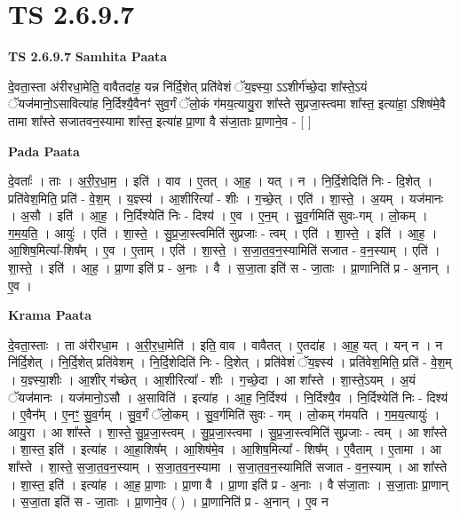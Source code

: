 \documentclass[17pt]{extarticle}
\begin{document}
\section*{ TS 2.6.9.7 }

\textbf{TS 2.6.9.7 } \newline
\textbf{Samhita Paata} \newline

दे॒वता॒स्ता अ॑रीरधा॒मेति॒ वावैतदा॑ह॒ यन्न नि॑र्दि॒शेत् प्रति॑वेशं ॅय॒ज्ञ्स्या॒ ऽऽशीर्ग॑च्छे॒दा शा᳚स्ते॒ऽयं ॅयज॑मानो॒ऽसावित्या॑ह नि॒र्दिश्यै॒वैनꣳ॑ सुव॒र्गं ॅलो॒कं ग॑मय॒त्यायु॒रा शा᳚स्ते सुप्रजा॒स्त्वमा शा᳚स्त॒ इत्या॑हा॒ ऽशिष॑मे॒वै तामा शा᳚स्ते सजातवन॒स्यामा शा᳚स्त॒ इत्या॑ह प्रा॒णा वै स॑जा॒ताः प्रा॒णाने॒व - [  ] \newline

\textbf{Pada Paata} \newline

दे॒वताः᳚ । ताः । अ॒री॒र॒धा॒म॒ । इति॑ । वाव । ए॒तत् । आ॒ह॒ । यत् । न । नि॒र्दि॒शेदिति॑ निः - दि॒शेत् । प्रति॑वेश॒मिति॒ प्रति॑ - वे॒श॒म् । य॒ज्ञ्स्य॑ । आ॒शीरित्या᳚ - शीः । ग॒च्छे॒त् । एति॑ । शा॒स्ते॒ । अ॒यम् । यज॑मानः । अ॒सौ । इति॑ । आ॒ह॒ । नि॒र्दिश्येति॑ निः - दिश्य॑ । ए॒व । ए॒न॒म् । सु॒व॒र्गमिति॑ सुवः-गम् । लो॒कम् । ग॒म॒य॒ति॒ । आयुः॑ । एति॑ । शा॒स्ते॒ । सु॒प्र॒जा॒स्त्वमिति॑ सुप्रजाः - त्वम् । एति॑ । शा॒स्ते॒ । इति॑ । आ॒ह॒ । आ॒शिष॒मित्या᳚-शिष᳚म् । ए॒व । ए॒ताम् । एति॑ । शा॒स्ते॒ । स॒जा॒त॒व॒न॒स्यामिति॑ सजात - व॒न॒स्याम् । एति॑ । शा॒स्ते॒ । इति॑ । आ॒ह॒ । प्रा॒णा इति॑ प्र - अ॒नाः । वै । स॒जा॒ता इति॑ स - जा॒ताः । प्रा॒णानिति॑ प्र - अ॒नान् । ए॒व ।  \newline


\textbf{Krama Paata} \newline

दे॒वता॒स्ताः । ता अ॑रीरधा॒म । अ॒री॒र॒धा॒मेति॑ । इति॒ वाव । वावैतत् । ए॒तदा॑ह । आ॒ह॒ यत् । यन् न । न नि॑र्दि॒शेत् । नि॒र्दि॒शेत् प्रति॑वेशम् । नि॒र्दि॒शेदिति॑ निः - दि॒शेत् । प्रति॑वेशं ॅय॒ज्ञ्स्य॑ । प्रति॑वेश॒मिति॒ प्रति॑ - वे॒श॒म् । य॒ज्ञ्स्या॒शीः । आ॒शीर् ग॑च्छेत् । आ॒शीरित्या᳚ - शीः । ग॒च्छे॒दा । आ शा᳚स्ते । शा॒स्ते॒ऽयम् । अ॒यं ॅयज॑मानः । यज॑मानो॒ऽसौ । अ॒साविति॑ । इत्या॑ह । आ॒ह॒ नि॒र्दिश्य॑ । नि॒र्दिश्यै॒व । नि॒र्दिश्येति॑ निः - दिश्य॑ । ए॒वैन᳚म् । ए॒नꣳ॒॒ सु॒व॒र्गम् । सु॒व॒र्गं ॅलो॒कम् । सु॒व॒र्गमिति॑ सुवः - गम् । लो॒कम् ग॑मयति । ग॒म॒य॒त्यायुः॑ । आयु॒रा । आ शा᳚स्ते । शा॒स्ते॒ सु॒प्र॒जा॒स्त्वम् । सु॒प्र॒जा॒स्त्वमा । सु॒प्र॒जा॒स्त्वमिति॑ सुप्रजाः - त्वम् । आ शा᳚स्ते । शा॒स्त॒ इति॑ । इत्या॑ह । आ॒हा॒शिष᳚म् । आ॒शिष॑मे॒व । आ॒शिष॒मित्या᳚ - शिष᳚म् । ए॒वैताम् । ए॒तामा । आ शा᳚स्ते । शा॒स्ते॒ स॒जा॒त॒व॒न॒स्याम् । स॒जा॒त॒व॒न॒स्यामा । स॒जा॒त॒व॒न॒स्यामिति॑ सजात - व॒न॒स्याम् । आ शा᳚स्ते । शा॒स्त॒ इति॑ । इत्या॑ह । आ॒ह॒ प्रा॒णाः । प्रा॒णा वै । प्रा॒णा इति॑ प्र - अ॒नाः । वै स॑जा॒ताः । स॒जा॒ताः प्रा॒णान् । स॒जा॒ता इति॑ स - जा॒ताः । प्रा॒णाने॒व ( ) । प्रा॒णानिति॑ प्र - अ॒नान् । ए॒व न \newline
\end{document}
